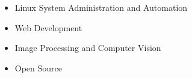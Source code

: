 

{\fontsize{11pt}{1em}\bodyfontlight\upshape\color{text}
  \begin{itemize}
\item Linux System Administration and Automation
  \item Web Development
  \item Image Processing and Computer Vision
  \item Open Source 
  \end{itemize}
}
